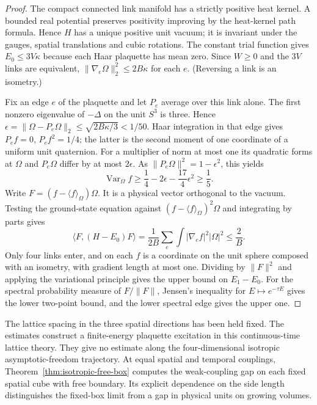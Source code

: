\begin{proof}
The compact connected link manifold has a strictly positive heat
kernel. A bounded real potential preserves positivity improving by
the heat-kernel path formula. Hence $H$ has a unique positive unit
vacuum; it is invariant under the gauges, spatial translations and
cubic rotations. The constant trial function gives $E_0\le3V\kappa$
because each Haar plaquette has mean zero. Since $W\ge0$ and the
$3V$ links are equivalent, $\|\nabla_e\Omega\|_2^2\le2B\kappa$
for each $e$. (Reversing a link is an isometry.)

Fix an edge $e$ of the plaquette and let $P_e$ average over this link
alone. The first nonzero eigenvalue of $-\Delta$ on the unit $S^3$ is
three. Hence $\epsilon=\|\Omega-P_e\Omega\|_2\le\sqrt{2B\kappa/3}<1/50$.
Haar integration in that edge gives $P_e f=0$, $P_e f^2=1/4$;
the latter is the second moment of one coordinate of a uniform
unit quaternion. For a multiplier of norm at most one its quadratic
forms at $\Omega$ and $P_e\Omega$ differ by at most $2\epsilon$.
As $\|P_e\Omega\|^2=1-\epsilon^2$, this yields
\[
 \operatorname{Var}_\Omega f\ge
 \frac14-2\epsilon-\frac{17}{4}\epsilon^2\ge\frac15 .
\]
Write $F=(f-\langle f\rangle_\Omega)\Omega$. It is a physical vector
orthogonal to the vacuum. Testing the ground-state equation against
$(f-\langle f\rangle_\Omega)^2\Omega$ and integrating by parts gives
\[
 \langle F,(H-E_0)F\rangle
 =\frac{1}{2B}\sum_e\int |\nabla_e f|^2|\Omega|^2\le \frac2B .
\]
Only four links enter, and on each $f$ is a coordinate on the unit
sphere composed with an isometry, with gradient length at most one.
Dividing by $\|F\|^2$ and applying the variational principle gives
the upper bound on $E_1-E_0$. For the spectral probability measure of
$F/\|F\|$, Jensen's inequality for $E\mapsto e^{-\tau E}$ gives the
lower two-point bound, and the lower spectral edge gives the upper one.
\end{proof}
The lattice spacing in the three spatial directions has been held fixed.
The estimates construct a finite-energy plaquette excitation in this
continuous-time lattice theory. They give no estimate along the
four-dimensional isotropic asymptotic-freedom trajectory.
At equal spatial and temporal couplings, Theorem~\ref{thm:isotropic-free-box}
computes the weak-coupling gap on each fixed spatial cube with free boundary.
Its explicit dependence on the side length distinguishes the fixed-box
limit from a gap in physical units on growing volumes.
